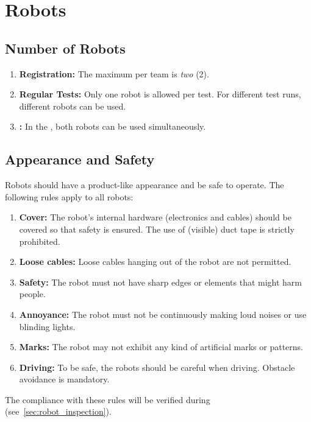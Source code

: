 \section{Robots}\label{rule:robots}

\subsection{Number of Robots}\label{rule:robots_number}

\begin{enumerate}
	\item \textbf{Registration:} The maximum  per team is \emph{two} (2).
	\item \textbf{Regular Tests:} Only one robot is allowed per test. For different test runs, different robots can be used.
	\item \textbf{\FINAL{}:} In the \FINAL{}, both robots can be used simultaneously.
\end{enumerate}

\subsection{Appearance and Safety}\label{rule:robot_appearance}

Robots should have a product-like appearance and be safe to operate.
The following rules apply to all robots:
\begin{enumerate}
	\item \textbf{Cover:} The robot's internal hardware (electronics and cables) should be covered so that safety is ensured. The use of (visible) duct tape is strictly prohibited.
	\item \textbf{Loose cables:} Loose cables hanging out of the robot are not permitted.
	\item \textbf{Safety:} The robot must not have sharp edges or elements that might harm people.
	\item \textbf{Annoyance:} The robot must not be continuously making loud noises or use blinding lights.
	\item \textbf{Marks:} The robot may not exhibit any kind of artificial marks or patterns.
	\item \textbf{Driving:} To be safe, the robots should be careful when driving. Obstacle avoidance is mandatory.
\end{enumerate}
The compliance with these rules will be verified during \RobotInspection{} (see~\ref{sec:robot_inspection}).







